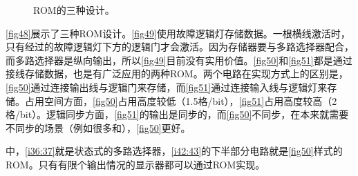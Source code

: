 \begin{figure}[!ht]
    \qquad
    \caption{ROM的三种设计。}\label{fig48}
\end{figure}
\autoref{fig48}展示了三种ROM设计。\autoref{fig49}使用故障逻辑灯存储数据。一根横线激活时，只有经过的故障逻辑灯下方的逻辑门才会激活。因为存储器要与多路选择器配合，而多路选择器是纵向输出，所以\autoref{fig49}目前没有实用价值。\autoref{fig50}和\autoref{fig51}都是通过接线存储数据，也是有广泛应用的两种ROM。两个电路在实现方式上的区别是，\autoref{fig50}通过连接输出线与逻辑门来存储，而\autoref{fig51}通过连接输入线与逻辑灯来存储。占用空间方面，\autoref{fig50}占用高度较低（1.5格/bit），\autoref{fig51}占用高度较高（2格/bit）。逻辑同步方面，\autoref{fig51}的输出是同步的，而\autoref{fig50}不同步，在本来就需要不同步的场景（例如很多和），\autoref{fig50}更好。

中，\autoref{i36:37}就是状态式的多路选择器，\autoref{i42:43}的下半部分电路就是\autoref{fig50}样式的ROM。只有有限个输出情况的显示器都可以通过ROM实现。

